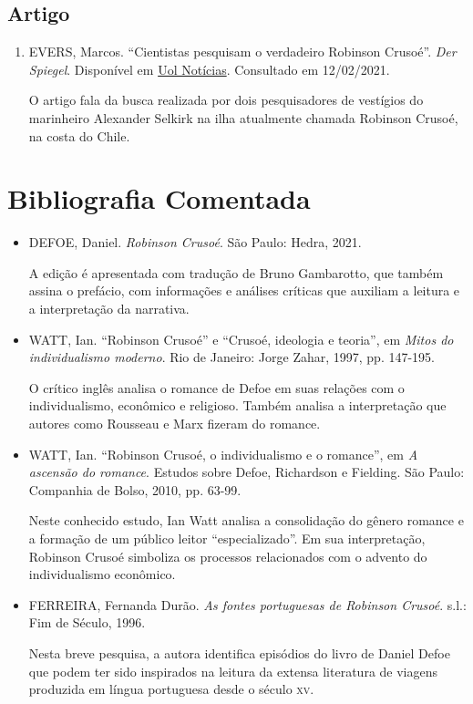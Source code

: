 \documentclass[12pt]{extarticle}
\begin{document}
\subsection{Artigo}

\begin{enumerate}
\item
EVERS, Marcos. ``Cientistas pesquisam o verdadeiro Robinson Crusoé''.
\emph{Der Spiegel}. Disponível em \href{https://noticias.uol.com.br/midia
global/derspiegel/2009/02/07/ult2682u1076.jhtm}{Uol Notícias}. Consultado em
12/02/2021.


O artigo fala da busca realizada por dois pesquisadores de vestígios do
marinheiro Alexander Selkirk na ilha atualmente chamada Robinson Crusoé,
na costa do Chile.
\end{enumerate}

\section{Bibliografia Comentada}

\begin{itemize}

\item \textsc{DEFOE}, Daniel. \emph{Robinson Crusoé}. São Paulo: Hedra, 2021.


A edição é apresentada com tradução de Bruno Gambarotto, que também
assina o prefácio, com informações e análises críticas que auxiliam a
leitura e a interpretação da narrativa.


\item \textsc{WATT}, Ian. ``Robinson Crusoé'' e ``Crusoé, ideologia e teoria'', em
\emph{Mitos do individualismo moderno}. Rio de Janeiro: Jorge Zahar,
1997, pp. 147-195.


O crítico inglês analisa o romance de Defoe em suas relações com o
individualismo, econômico e religioso. Também analisa a interpretação
que autores como Rousseau e Marx fizeram do romance.


\item \textsc{WATT}, Ian. ``Robinson Crusoé, o individualismo e o romance'', em \emph{A
ascensão do romance}. Estudos sobre Defoe, Richardson e Fielding. São
Paulo: Companhia de Bolso, 2010, pp. 63-99.


Neste conhecido estudo, Ian Watt analisa a consolidação do gênero
romance e a formação de um público leitor ``especializado''. Em sua
interpretação, Robinson Crusoé simboliza os processos relacionados com
o advento do individualismo econômico.


\item \textsc{FERREIRA}, Fernanda Durão. \emph{As fontes portuguesas de Robinson
Crusoé}. s.l.: Fim de Século, 1996.


Nesta breve pesquisa, a autora identifica episódios do livro de Daniel
Defoe que podem ter sido inspirados na leitura da extensa literatura de
viagens produzida em língua portuguesa desde o século \textsc{xv}.
\end{itemize}
\end{document}
